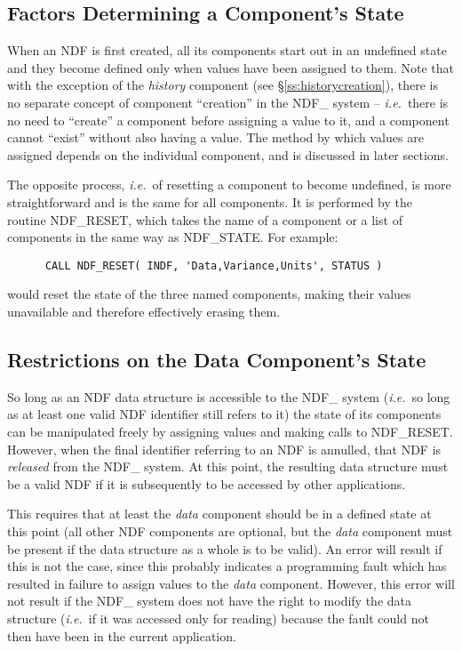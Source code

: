 \documentclass[twoside,11pt]{article}
\newcommand{\htmlref}[2]{#1}
\newcommand{\xlabel}[1]{}
\newcommand{\st}[1]{{\em{#1}}}
\begin{document}
\subsection{\xlabel{factors_determining_a_components_state}\label{ss:reset}Factors Determining a Component's State}

When an NDF is first created, all its components start out in an
undefined state and they become defined only when values have been
assigned to them.  Note that with the exception of the \st{history\/}
component (see \S\ref{ss:historycreation}), there is no separate
concept of component ``creation'' in the NDF\_ system --
\st{i.e.}\ there is no need to ``create'' a component before assigning
a value to 
it, and a component cannot ``exist'' without also having a value.  The
method by which values are assigned depends on the individual
component, and is discussed in later sections.

The opposite process, \st{i.e.}\ of resetting a component to become
undefined, is more straightforward and is the same for all components. 
It is performed by the routine \htmlref{NDF\_RESET}{NDF_RESET}, which takes the name of a
component or a list of components in the same way as \htmlref{NDF\_STATE}{NDF_STATE}. 
For example:

\small
\begin{verbatim}
      CALL NDF_RESET( INDF, 'Data,Variance,Units', STATUS )
\end{verbatim}
\normalsize

would reset the state of the three named components, making their values 
unavailable and therefore effectively erasing them.

\subsection{\xlabel{restrictions_on_the_data_components_state}Restrictions on the Data Component's State}

So long as an NDF data structure is accessible to the NDF\_ system
(\st{i.e.}\ so long as at least one valid NDF identifier still refers
to it) the 
state of its components can be manipulated freely by assigning values and
making calls to \htmlref{NDF\_RESET}{NDF_RESET}. 
However, when the final identifier referring to an NDF is annulled, that NDF
is \st{released\/} from the NDF\_ system. 
At this point, the resulting data structure must be a valid NDF if it is
subsequently to be accessed by other applications.

This requires that at least the \st{data\/} component should be in a defined
state at this point (all other NDF components are optional, but the
\st{data\/} component must be present if the data structure as a whole
is to be 
valid). 
An error will result if this is not the case, since this probably indicates
a programming fault which has resulted in failure to assign values to
the \st{data\/} component.  
However, this error will not result if the NDF\_ system does not have the
right to modify the data structure (\st{i.e.}\ if it was accessed only for
reading) because the fault could not then have been in the current application. 
\end{document}

